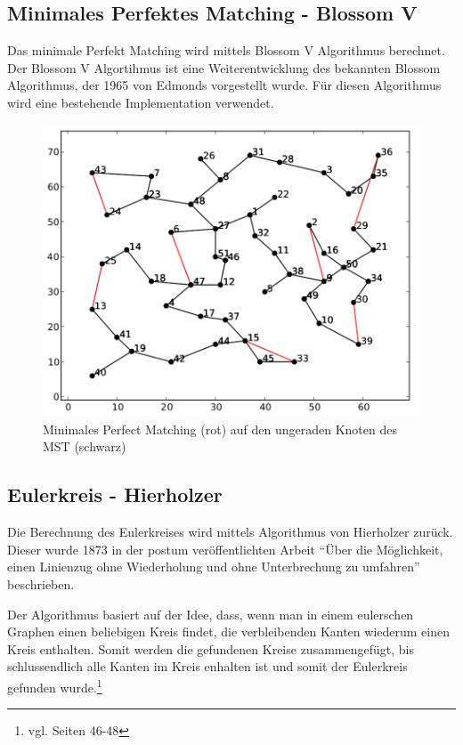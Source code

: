 \documentclass[11pt,a4paper]{article}
\begin{document}

\subsection{Minimales Perfektes Matching - Blossom V}
Das minimale Perfekt Matching wird mittels Blossom V Algorithmus berechnet. Der Blossom V Algortihmus ist eine Weiterentwicklung des bekannten Blossom Algorithmus, der 1965 von Edmonds vorgestellt wurde.
Für diesen Algorithmus wird eine bestehende Implementation verwendet. 

\begin{figure}[H]
        \centering
        \includegraphics[width=14cm]{gfx/eil51_pm}
        \caption{Minimales Perfect Matching (rot) auf den ungeraden Knoten des MST (schwarz)}
        \label{img:eil51_pm}
\end{figure}

\subsection{Eulerkreis - Hierholzer}
Die Berechnung des Eulerkreises wird mittels Algorithmus von Hierholzer zurück. Dieser wurde 1873 in der postum veröffentlichten Arbeit "`Über die Möglichkeit, einen Linienzug ohne Wiederholung und ohne Unterbrechung zu umfahren"'\cite{hierholzer73} beschrieben.

Der Algorithmus basiert auf der Idee, dass, wenn man in einem eulerschen Graphen einen beliebigen Kreis findet, die verbleibenden Kanten wiederum einen Kreis enthalten. Somit werden die gefundenen Kreise zusammengefügt, bis schlussendlich alle Kanten im Kreis enhalten ist und somit der Eulerkreis gefunden wurde.\footnote{vgl. \cite{krumke05} Seiten 46-48}
\end{document}
